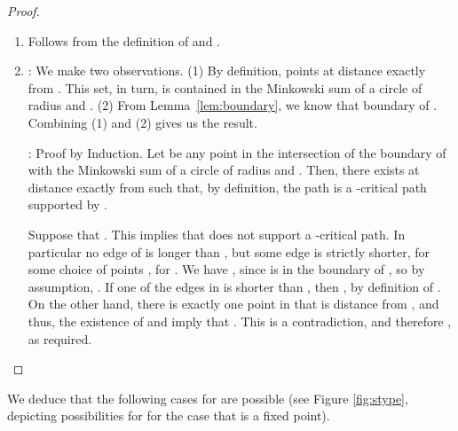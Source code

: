 \begin{proof}\
\begin{enumerate}
  \item Follows from the definition of  and .
 \item
  : We make two observations. (1) By definition, points at distance exactly  from . This set, in turn, is contained in the Minkowski sum of a circle of radius  and . (2) From Lemma~\ref{lem:boundary}, we know that
    boundary of  . Combining (1) and (2) gives us the result.


  : Proof by Induction.  Let  be any point in the
  intersection of the boundary of  with the Minkowski
  sum of a circle of radius  and .
  Then, there exists  at distance
  exactly  from  such that, by
  definition,   the path  is a -critical
  path supported by .

  
          
  Suppose that .  This implies that
   does not support a
  -critical path.  In particular no edge of
   is longer than , but
  some edge is strictly shorter, for some choice of points
  , for . We have ,
  since  is in the boundary of , so by assumption,
  .  If one of the edges in
   is shorter than , then
  , by definition of
  .  On the other hand, there is exactly one point
  in  that is distance  from , and thus, the
  existence of  and  imply that
  .  This is a contradiction, and therefore 
      , as required.


  
  

  


  \end{enumerate}
 \end{proof}


\noindent We deduce that the following cases for  are possible (see Figure \ref{fig:stype}, depicting possibilities for  for the case that  is a fixed point).

\renewcommand{\redcolour}{darkgray}

